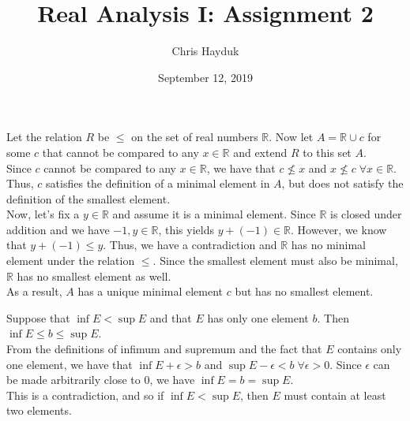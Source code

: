 \documentclass[12pt]{article}
\newenvironment{problem}[2][Problem]{\begin{trivlist}
\item[\hskip \labelsep {\bfseries #1}\hskip \labelsep {\bfseries #2.}]}{\end{trivlist}}
\begin{document}
\title{Real Analysis I: Assignment 2}

\author{Chris Hayduk}
\date{September 12, 2019}

\maketitle

\begin{problem}{1}
\end{problem}

Let the relation $R$ be $\leq$ on the set of real numbers $\mathbb{R}$. Now let $A = \mathbb{R} \cup c$ for some $c$ that cannot be compared to any $x \in \mathbb{R}$ and extend $R$ to this set $A$.\\

Since $c$ cannot be compared to any $x \in \mathbb{R}$, we have that $c \nleq x$ and $x \nleq c \; \forall x \in \mathbb{R}$. Thus, $c$ satisfies the definition of a minimal element in $A$, but does not satisfy the definition of the smallest element.\\

Now, let's fix a $y \in \mathbb{R}$ and assume it is a minimal element. Since $\mathbb{R}$ is closed under addition and we have $-1, y \in \mathbb{R}$, this yields $y + (-1) \in \mathbb{R}$. However, we know that $y + (-1) \leq y$. Thus, we have a contradiction and $\mathbb{R}$ has no minimal element under the relation $\leq$. Since the smallest element must also be minimal, $\mathbb{R}$ has no smallest element as well.\\

As a result, $A$ has a unique minimal element $c$ but has no smallest element.

\begin{problem}{2}
\end{problem}

Suppose that $\inf E < \sup E$ and that $E$ has only one element $b$. Then $\inf E \leq b \leq \sup E$.\\

From the definitions of infimum and supremum and the fact that $E$ contains only one element, we have that $\inf E + \epsilon > b$ and $\sup E - \epsilon < b \; \forall \epsilon > 0$. Since $\epsilon$ can be made arbitrarily close to 0, we have $\inf E = b = \sup E$.\\

This is a contradiction, and so if $\inf E < \sup E$, then $E$ must contain at least two elements.\\
\end{document}
